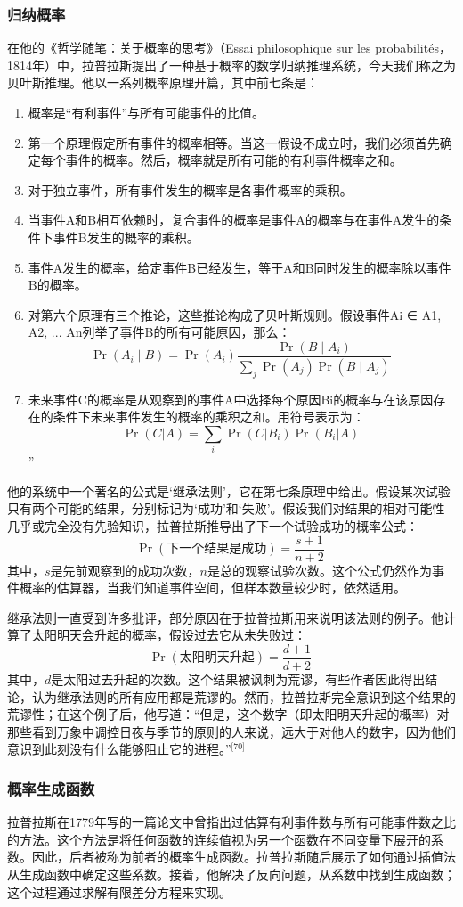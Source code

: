 \subsubsection{归纳概率}  
在他的《哲学随笔：关于概率的思考》（Essai philosophique sur les probabilités，1814年）中，拉普拉斯提出了一种基于概率的数学归纳推理系统，今天我们称之为贝叶斯推理。他以一系列概率原理开篇，其中前七条是：
\begin{enumerate}
\item 概率是“有利事件”与所有可能事件的比值。
\item 第一个原理假定所有事件的概率相等。当这一假设不成立时，我们必须首先确定每个事件的概率。然后，概率就是所有可能的有利事件概率之和。
\item 对于独立事件，所有事件发生的概率是各事件概率的乘积。
\item 当事件A和B相互依赖时，复合事件的概率是事件A的概率与在事件A发生的条件下事件B发生的概率的乘积。
\item 事件A发生的概率，给定事件B已经发生，等于A和B同时发生的概率除以事件B的概率。
\item 对第六个原理有三个推论，这些推论构成了贝叶斯规则。假设事件Ai ∈ {A1, A2, ... An}列举了事件B的所有可能原因，那么：  
   \[
   \Pr(A_{i}\mid B) = \Pr(A_{i}) \frac{\Pr(B \mid A_{i})}{\sum _{j} \Pr(A_{j}) \Pr(B \mid A_{j})}~
   \]
\item 未来事件C的概率是从观察到的事件A中选择每个原因Bi的概率与在该原因存在的条件下未来事件发生的概率的乘积之和。用符号表示为：  
   \[
   \Pr(C|A) = \sum _{i} \Pr(C|B_{i}) \Pr(B_{i}|A)~
   \]”
\end{enumerate}
他的系统中一个著名的公式是‘继承法则’，它在第七条原理中给出。假设某次试验只有两个可能的结果，分别标记为‘成功’和‘失败’。假设我们对结果的相对可能性几乎或完全没有先验知识，拉普拉斯推导出了下一个试验成功的概率公式：
\[
\Pr(\text{下一个结果是成功}) = \frac{s+1}{n+2}~
\]
其中，\(s\)是先前观察到的成功次数，\(n\)是总的观察试验次数。这个公式仍然作为事件概率的估算器，当我们知道事件空间，但样本数量较少时，依然适用。

继承法则一直受到许多批评，部分原因在于拉普拉斯用来说明该法则的例子。他计算了太阳明天会升起的概率，假设过去它从未失败过：
\[
\Pr(\text{太阳明天升起}) = \frac{d+1}{d+2}~
\]
其中，\(d\)是太阳过去升起的次数。这个结果被讽刺为荒谬，有些作者因此得出结论，认为继承法则的所有应用都是荒谬的。然而，拉普拉斯完全意识到这个结果的荒谬性；在这个例子后，他写道：“但是，这个数字（即太阳明天升起的概率）对那些看到万象中调控日夜与季节的原则的人来说，远大于对他人的数字，因为他们意识到此刻没有什么能够阻止它的进程。”\(^\text{[70]}\)
\subsubsection{概率生成函数}  
拉普拉斯在1779年写的一篇论文中曾指出过估算有利事件数与所有可能事件数之比的方法。这个方法是将任何函数的连续值视为另一个函数在不同变量下展开的系数。因此，后者被称为前者的概率生成函数。拉普拉斯随后展示了如何通过插值法从生成函数中确定这些系数。接着，他解决了反向问题，从系数中找到生成函数；这个过程通过求解有限差分方程来实现。
